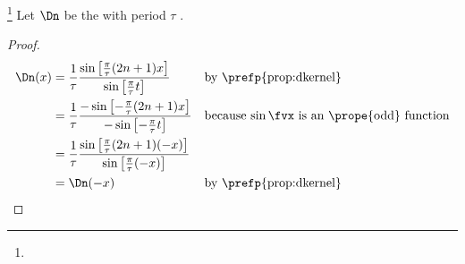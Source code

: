\begin{proposition}
\footnote{
  }
\label{prop:dkernel_even}
Let $\Dn$ be the  with period $\tau$ .
\end{proposition}
\begin{proof}
\begin{align*}
\Dn(x) 
    &= \frac{1}{\tau}
       \frac{\sin\left[ \frac{\pi}{\tau}(2n+1)x  \right] }
            {\sin\left[ \frac{\pi}{\tau}t        \right] }
    && \text{by \prefp{prop:dkernel}}
  \\&= \frac{1}{\tau}
       \frac{-\sin\left[-\frac{\pi}{\tau}(2n+1)x  \right] }
            {-\sin\left[-\frac{\pi}{\tau}t        \right] }
    && \text{because $\sin\fvx$ is an \prope{odd} function}
  \\&= \frac{1}{\tau}
       \frac{\sin\left[\frac{\pi}{\tau}(2n+1)(-x)  \right] }
            {\sin\left[\frac{\pi}{\tau}(-x)        \right] }
  \\&= \Dn(-x)
    && \text{by \prefp{prop:dkernel}}
\end{align*}
\end{proof}




